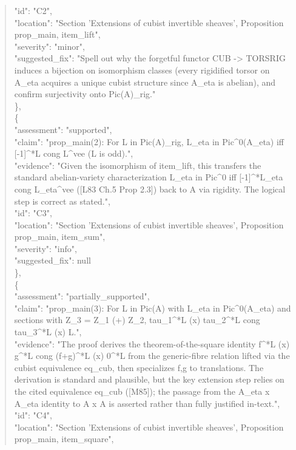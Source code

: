 \documentclass[11pt]{article}
\begin{document}
\begin{quote}
      "id": "C2",\\
      "location": "Section 'Extensions of cubist invertible sheaves', Proposition prop\_main, item\_lift",\\
      "severity": "minor",\\
      "suggested\_fix": "Spell out why the forgetful functor CUB -> TORSRIG induces a bijection on isomorphism classes (every rigidified torsor on A\_eta acquires a unique cubist structure since A\_eta is abelian), and confirm surjectivity onto Pic(A)\_rig."\\
    \},\\
    \{\\
      "assessment": "supported",\\
      "claim": "prop\_main(2): For L in Pic(A)\_rig, L\_eta in Pic\^{}0(A\_eta) iff [-1]\^{}*L cong L\^{}vee (L is odd).",\\
      "evidence": "Given the isomorphism of item\_lift, this transfers the standard abelian-variety characterization L\_eta in Pic\^{}0 iff [-1]\^{}*L\_eta cong L\_eta\^{}vee ([L83 Ch.5 Prop 2.3]) back to A via rigidity. The logical step is correct as stated.",\\
      "id": "C3",\\
      "location": "Section 'Extensions of cubist invertible sheaves', Proposition prop\_main, item\_sum",\\
      "severity": "info",\\
      "suggested\_fix": null\\
    \},\\
    \{\\
      "assessment": "partially\_supported",\\
      "claim": "prop\_main(3): For L in Pic(A) with L\_eta in Pic\^{}0(A\_eta) and sections with Z\_3 = Z\_1 (+) Z\_2, tau\_1\^{}*L (x) tau\_2\^{}*L cong tau\_3\^{}*L (x) L.",\\
      "evidence": "The proof derives the theorem-of-the-square identity f\^{}*L (x) g\^{}*L cong (f+g)\^{}*L (x) 0\^{}*L from the generic-fibre relation lifted via the cubist equivalence eq\_cub, then specializes f,g to translations. The derivation is standard and plausible, but the key extension step relies on the cited equivalence eq\_cub ([M85]); the passage from the A\_eta x A\_eta identity to A x A is asserted rather than fully justified in-text.",\\
      "id": "C4",\\
      "location": "Section 'Extensions of cubist invertible sheaves', Proposition prop\_main, item\_square",\\

\end{quote}
\end{document}
